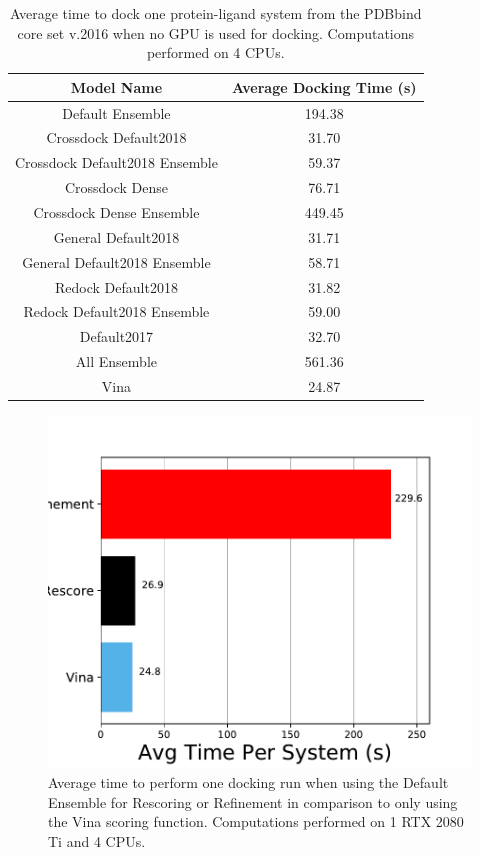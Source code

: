 \documentclass[journal=jcisd8,manuscript=article]{achemso}
\begin{document}
\begin{table}    
        \centering
        \begin{tabular}{|c|c|}
                \hline Model Name & Average Docking Time (s) \\ \hline
                Default Ensemble & 194.38\\ \hline
                Crossdock Default2018 & 31.70\\ \hline
                Crossdock Default2018 Ensemble & 59.37\\ \hline
                Crossdock Dense & 76.71\\ \hline
                Crossdock Dense Ensemble & 449.45\\ \hline
                General Default2018 & 31.71\\ \hline
                General Default2018 Ensemble & 58.71\\ \hline
                Redock Default2018 & 31.82\\ \hline
                Redock Default2018 Ensemble & 59.00\\ \hline
                Default2017 & 32.70\\ \hline
                All Ensemble & 561.36\\ \hline
                Vina & 24.87\\ \hline
        \end{tabular}    
        \caption{Average time to dock one protein-ligand system from the PDBbind core set v.2016 when no GPU is used for docking. Computations performed on 4 CPUs.}
        \label{tab:OptimalRescoreNoGPU}
\end{table}    

\begin{figure}
    \centering
    \includegraphics{figures/other/refine_timing_comparison.pdf}
    \caption{Average time to perform one docking run when using the Default Ensemble for Rescoring or Refinement in comparison to only using the Vina scoring function. Computations performed on 1 RTX 2080 Ti and 4 CPUs.}
    \label{fig:RefineTiming}
\end{figure}
\end{document}
